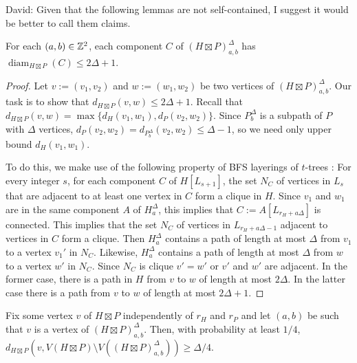 \documentclass{patmorin}
\renewcommand{\ge}{\geqslant}
\renewcommand{\le}{\leqslant}
\newcommand{\david}[1]{{\color{orange} David: #1}}
\DeclareMathOperator{\diam}{diam}
\begin{document}
\david{Given that the following lemmas are not self-contained, I suggest it would be better to call them claims. }

\begin{lem}\label{component_diameter}
  For each $(a,b)\in\mathbb{Z}^2$, each component $C$ of $(H\boxtimes P)^\Delta_{a,b}$ has $\diam_{H\boxtimes P}(C)\le 2\Delta+1$.
\end{lem}

\begin{proof}
  Let $v:=(v_1,v_2)$ and $w:=(w_1,w_2)$ be two vertices of $(H\boxtimes P)^\Delta_{a,b}$.  Our task is to show that $d_{H\boxtimes P}(v,w)\le 2\Delta+1$.  Recall that
  $d_{H\boxtimes P}(v,w)=\max\{d_{H}(v_1,w_1),d_{P}(v_2,w_2)\}$.  Since $P^\Delta_b$ is a subpath of $P$ with $\Delta$ vertices, $d_P(v_2,w_2)=d_{P^\Delta_b}(v_2,w_2)\le\Delta-1$, so we need only upper bound $d_{H}(v_1,w_1)$.

  To do this, we make use of the following property of BFS layerings of $t$-trees \cite{KP08,DMW05}:  For every integer $s$,
  for each component $C$ of $H[L_{s+1}]$,
    the set $N_C$ of vertices in $L_{s}$ that are adjacent to at least one vertex in $C$ form a clique in $H$.
  Since $v_1$ and $w_1$ are in the same component $A$ of $H^\Delta_a$, this implies that $C:=A[L_{r_H+a\Delta}]$ is connected.  This implies that the set $N_C$ of vertices in $L_{r_H+a\Delta-1}$ adjacent to vertices in $C$ form a clique.  Then $H^\Delta_a$ contains a path of length at most $\Delta$ from $v_1$ to a vertex $v_1'$ in $N_C$.   Likewise, $H^\Delta_a$ contains a path of length at most $\Delta$ from $w$ to a vertex $w'$ in $N_C$. Since $N_C$ is clique $v'=w'$ or $v'$ and $w'$ are adjacent.  In the former case, there is a path in $H$ from $v$ to $w$ of length at most $2\Delta$. In the latter case there is a path from $v$ to $w$ of length at most $2\Delta+1$.
\end{proof}

\begin{lem}\label{good_probability}
  Fix some vertex $v$ of $H\boxtimes P$ independently of $r_H$ and $r_P$ and let $(a,b)$ be such that $v$ is a vertex of $(H\boxtimes P)^\Delta_{a,b}$.  Then, with probability at least $1/4$,  $d_{H\boxtimes P}(v, V(H\boxtimes P)\setminus V((H\boxtimes P)^\Delta_{a,b})) \ge \Delta/4$.
\end{lem}
\end{document}
